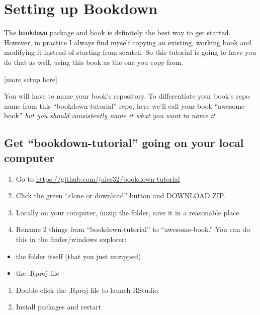 \documentclass[
]{book}
\providecommand{\tightlist}{%
  \setlength{\itemsep}{0pt}\setlength{\parskip}{0pt}}
\theoremstyle{definition}
\theoremstyle{definition}
\theoremstyle{definition}
\theoremstyle{remark}
\begin{document}
\hypertarget{setup}{%
\chapter{Setting up Bookdown}\label{setup}}

The \texttt{bookdown} package and \href{https://bookdown.org/yihui/bookdown/get-started.html}{book} is definitely the best way to get started. However, in practice I always find myself copying an existing, working book and modifying it instead of starting from scratch. So this tutorial is going to have you do that as well, using this book as the one you copy from.

{[}more setup here{]}

You will have to name your book's repository. To differentiate your book's repo name from this ``bookdown-tutorial'' repo, here we'll call your book ``awesome-book'' \emph{but you should consistently name it what you want to name it}.

\hypertarget{get-bookdown-tutorial-going-on-your-local-computer}{%
\section{Get ``bookdown-tutorial'' going on your local computer}\label{get-bookdown-tutorial-going-on-your-local-computer}}

\begin{enumerate}
\def\labelenumi{\arabic{enumi}.}
\tightlist
\item
  Go to \url{https://github.com/jules32/bookdown-tutorial}
\item
  Click the green ``clone or download'' button and DOWNLOAD ZIP.
\item
  Locally on your computer, unzip the folder, save it in a reasonable place
\item
  Rename 2 things from ``bookdown-tutorial'' to ``awesome-book.'' You can do this in the finder/windows explorer:
\end{enumerate}

\begin{itemize}
\tightlist
\item
  the folder itself (that you just unzipped)
\item
  the .Rproj file
\end{itemize}

\begin{enumerate}
\def\labelenumi{\arabic{enumi}.}
\tightlist
\item
  Double-click the .Rproj file to launch RStudio
\item
  Install packages and restart
\end{enumerate}
\end{document}
